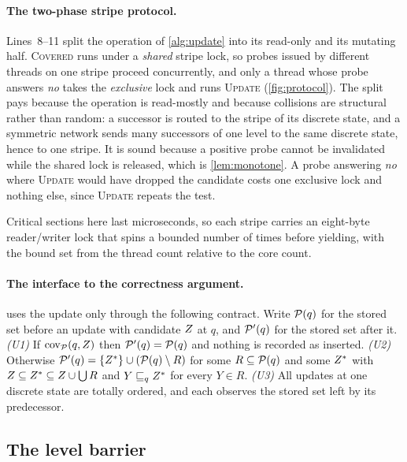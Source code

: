 \paragraph{The two-phase stripe protocol.}
Lines~8--11 split the operation of \cref{alg:update} into its read-only and its
mutating half.  \textsc{Covered} runs under a \emph{shared} stripe lock, so
probes issued by different threads on one stripe proceed concurrently, and only a
thread whose probe answers \emph{no} takes the \emph{exclusive} lock and runs
\textsc{Update} (\cref{fig:protocol}).  The split pays because the operation is
read-mostly and because collisions are structural rather than random: a successor
is routed to the stripe of its discrete state, and a symmetric network sends many
successors of one level to the same discrete state, hence to one stripe.  It is
sound because a positive probe cannot be invalidated while the shared lock is
released, which is \cref{lem:monotone}.  A probe answering \emph{no} where
\textsc{Update} would have dropped the candidate costs one exclusive lock and
nothing else, since \textsc{Update} repeats the test.

\figprotocol

Critical sections here last microseconds, so each stripe carries an eight-byte
reader/writer lock that spins a bounded number of times before yielding, with the
bound set from the thread count relative to the core count.

\paragraph{The interface to the correctness argument.}
 uses the update only through the following contract.  Write
$\mathcal{P}(q)$ for the stored set before an update with candidate $Z$ at $q$,
and $\mathcal{P}'(q)$ for the stored set after it.
\emph{(U1)} If $\mathrm{cov}_{\mathcal{P}}(q,Z)$ then $\mathcal{P}'(q) = \mathcal{P}(q)$
and nothing is recorded as inserted.
\emph{(U2)} Otherwise $\mathcal{P}'(q) = \{Z^{*}\} \cup (\mathcal{P}(q) \setminus R)$
for some $R \subseteq \mathcal{P}(q)$ and some $Z^{*}$ with $Z \subseteq
Z^{*} \subseteq Z \cup \bigcup R$ and $Y \sqsubseteq_q Z^{*}$ for every $Y
\in R$.
\emph{(U3)} All updates at one discrete state are totally ordered, and each
observes the stored set left by its predecessor.

\subsection{The level barrier}\label{sec:barrier}


